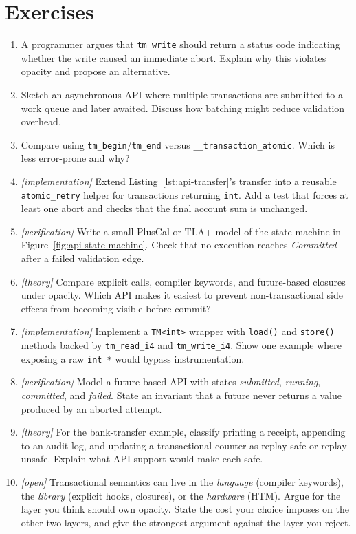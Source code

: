 \section{Exercises}
\begin{enumerate}
    \item A programmer argues that \texttt{tm\_write} should return a status code indicating whether the write caused an immediate abort. Explain why this violates opacity and propose an alternative.
    \item Sketch an asynchronous API where multiple transactions are submitted to a work queue and later awaited. Discuss how batching might reduce validation overhead.
    \item Compare using \texttt{tm\_begin}\slash{}\texttt{tm\_end} versus \texttt{\_\_transaction\_\allowbreak atomic}. Which is less error-prone and why?
    \item \emph{[implementation]} Extend Listing~\ref{lst:api-transfer}'s transfer into a reusable \texttt{atomic\_retry} helper for transactions returning \texttt{int}. Add a test that forces at least one abort and checks that the final account sum is unchanged.
    \item \emph{[verification]} Write a small PlusCal or TLA+ model of the state machine in Figure~\ref{fig:api-state-machine}. Check that no execution reaches \emph{Committed} after a failed validation edge.
    \item \emph{[theory]} Compare explicit calls, compiler keywords, and future-based closures under opacity. Which API makes it easiest to prevent non-transactional side effects from becoming visible before commit?
    \item \emph{[implementation]} Implement a \texttt{TM<int>} wrapper with \texttt{load()} and \texttt{store()} methods backed by \texttt{tm\_read\_i4} and \texttt{tm\_write\_i4}. Show one example where exposing a raw \texttt{int *} would bypass instrumentation.
    \item \emph{[verification]} Model a future-based API with states \emph{submitted}, \emph{running}, \emph{committed}, and \emph{failed}. State an invariant that a future never returns a value produced by an aborted attempt.
    \item \emph{[theory]} For the bank-transfer example, classify printing a receipt, appending to an audit log, and updating a transactional counter as replay-safe or replay-unsafe. Explain what API support would make each safe.
    \item \emph{[open]} Transactional semantics can live in the \emph{language} (compiler keywords), the \emph{library} (explicit hooks, closures), or the \emph{hardware} (HTM).  Argue for the layer you think should own opacity.  State the cost your choice imposes on the other two layers, and give the strongest argument against the layer you reject.
\end{enumerate}

